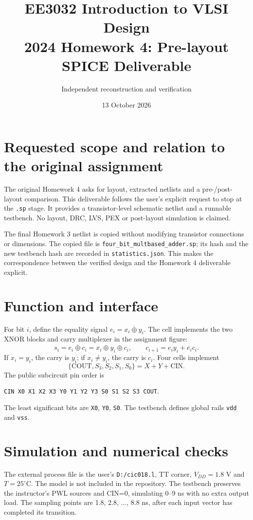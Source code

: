 \documentclass[10pt,a4paper]{article}
\title{EE3032 Introduction to VLSI Design\\2024 Homework 4: Pre-layout SPICE Deliverable}
\author{Independent reconstruction and verification}
\date{13 October 2026}
\begin{document}
\maketitle

\section{Requested scope and relation to the original assignment}
The original Homework 4 asks for layout, extracted netlists and a pre-/post-layout
comparison. This deliverable follows the user's explicit request to stop at the
\texttt{.sp} stage. It provides a transistor-level schematic netlist and a runnable
testbench. No layout, DRC, LVS, PEX or post-layout simulation is claimed.

The final Homework 3 netlist is copied without modifying transistor connections
or dimensions. The copied file is \texttt{four\_bit\_multbased\_adder.sp}; its hash
and the new testbench hash are recorded in \texttt{statistics.json}. This makes
the correspondence between the verified design and the Homework 4 deliverable
explicit.

\section{Function and interface}
For bit $i$, define the equality signal $e_i=\overline{x_i\oplus y_i}$. The cell
implements the two XNOR blocks and carry multiplexer in the assignment figure:
\[
 s_i=\overline{e_i\oplus c_i}=x_i\oplus y_i\oplus c_i,\qquad
 c_{i+1}=e_i y_i+\overline{e_i}c_i.
\]
If $x_i=y_i$, the carry is $y_i$; if $x_i\ne y_i$, the carry is $c_i$.
Four cells implement
\[
 \{\mathrm{COUT},S_3,S_2,S_1,S_0\}=X+Y+\mathrm{CIN}.
\]
The public subcircuit pin order is
\begin{center}\small
\texttt{CIN X0 X1 X2 X3 Y0 Y1 Y2 Y3 S0 S1 S2 S3 COUT}.
\end{center}
The least significant bits are \texttt{X0}, \texttt{Y0}, \texttt{S0}.
The testbench defines global rails \texttt{vdd} and \texttt{vss}.

\section{Simulation and numerical checks}
The external process file is the user's \texttt{D:/cic018.l}, TT corner,
$V_{DD}=1.8$ V and $T=25^\circ$C. The model is not included in the repository.
The testbench preserves the instructor's PWL sources and CIN=0, simulating
0--9 ns with no extra output load. The sampling points are 1.8, 2.8, $\ldots$,
8.8 ns, after each input vector has completed its transition.
\end{document}
